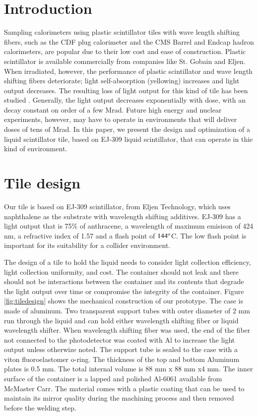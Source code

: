 \documentclass[review]{elsarticle}
\begin{document}
\section{Introduction}
Sampling calorimeters using plastic scintillator tiles with wave length shifting fibers, such as the CDF plug calorimeter \cite{Aota1995557}
and the CMS Barrel\cite{CMSHB} and Endcap\cite{HCALTDR1997} hadron calorimeters, are popular due to their low cost and ease of construction.  Plastic scintillator is available commercially from companies like St. Gobain and Eljen.  When irradiated, however, the performance of plastic scintillator and wave length shifting fibers deteriorate; light self-absorption (yellowing) increases and light output decreases.  The resulting loss of light output for this kind of tile has been studied
\cite{vasken}\cite{ByonWagner1993263}.
Generally, the light output decreases exponentially with dose, with an decay constant on order of a few Mrad.  Future high energy and nuclear experiments, however, may have to operate in environments that will deliver doses of tens of Mrad.  In this paper, we present the design and optimization of a liquid scintillator tile, based on EJ-309 liquid scintillator, that can operate in thie kind of environment.


\section{Tile design}

Our tile is based on EJ-309 scintillator, from Eljen Technology, which uses naphthalene as the substrate with wavelength shifting additives.  EJ-309 has a light output that is 75\% of anthracene, a wavelength of maximum emisison of 424 nm, a refractive index of 1.57 and a flash point of $\rm{144^o}$C.  The low flash point is important for its suitability for a collider environment.

The design of a tile to hold the liquid needs to consider light collection efficiency, light collection uniformity, and cost.  The container should not leak and there should not be interactions between the container and its contents that degrade the light output over time or compromise the integrity
of the container.
Figure \ref{fig:tiledesign} shows the mechanical construction of our prototype.  The case is made of aluminum.  Two transparent support tubes with outer diameter of 2 mm run through the liquid and can hold either wavelength shifting fiber or liquid wavelength shifter.  When wavelength shifting fiber was used, the end of the fiber not connected to the photodetector was coated with Al to increase the light output unless otherwize noted.
The support tube is sealed to the case with a viton fluoroelastomer o-ring.  The thickness of the top and bottom Aluminum plates is 0.5 mm.  The total internal volume is 88 mm x 88 mm x4 mm. The inner surface of the container
is a lapped and polished Al-6061 available from McMaster Carr. The material comes with a plastic coating that can be 
used to maintain its mirror quality during the machining process and then removed before the welding step. 
\end{document}
